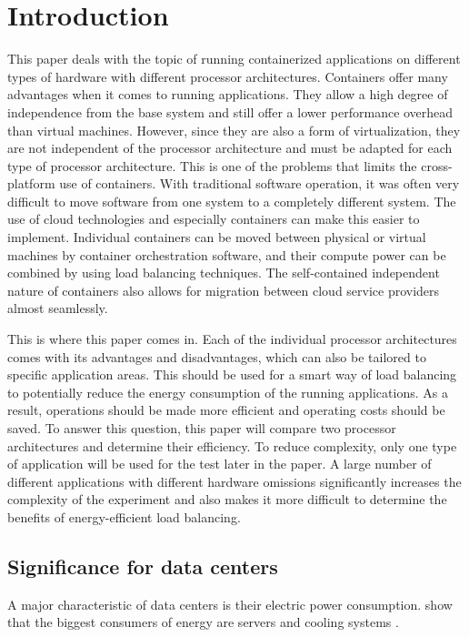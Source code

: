 \section{Introduction}
This paper deals with the topic of running containerized applications on
different types of hardware with different processor architectures.  Containers
offer many advantages when it comes to running applications. They allow a high
degree of independence from the base system and still offer a lower performance
overhead than virtual machines. However, since they are also a form of
virtualization, they are not independent of the processor architecture and must
be adapted for each type of processor architecture. This is one of the problems
that limits the cross-platform use of containers.  With traditional software
operation, it was often very difficult to move software from one system to a
completely different system. The use of cloud technologies and especially
containers can make this easier to implement. Individual containers can be
moved between physical or virtual machines by container orchestration software,
and their compute power can be combined by using load balancing techniques.
The self-contained independent nature of containers also allows for migration
between cloud service providers almost seamlessly.

This is where this paper comes in. Each of the individual processor
architectures comes with its advantages and disadvantages, which can also be
tailored to specific application areas. This should be used for a smart way of
load balancing to potentially reduce the energy consumption of the running
applications. As a result, operations should be made more efficient and
operating costs should be saved.  To answer this question, this paper will
compare two processor architectures and determine their efficiency. To reduce
complexity, only one type of application will be used for the test later in the
paper. A large number of different applications with different hardware
omissions significantly increases the complexity of the experiment and also
makes it more difficult to determine the benefits of energy-efficient load
balancing.

\subsection{Significance for data centers}
A major characteristic of data centers is their
electric power consumption. 
\citeauthor{mahadevan2011energy} show that
the biggest consumers of energy are
servers and cooling systems
\cite{mahadevan2011energy}.

